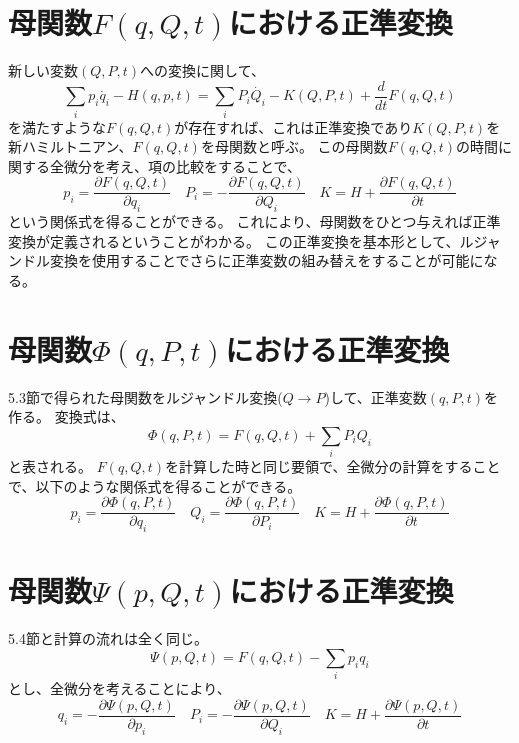 \documentclass[a4paper]{jsreport}
\begin{document}
        \section{母関数$F(q, Q, t)$における正準変換}
            新しい変数$(Q, P, t)$への変換に関して、
            \begin{equation}
                \sum_{i} p_i \dot{q_i} - H(q, p, t) = \sum_{i} P_i \dot{Q_i} - K(Q, P, t) + \frac{d}{dt} F(q, Q, t)
            \end{equation}
            を満たすような$F(q, Q, t)$が存在すれば、これは正準変換であり$K(Q, P, t)$を新ハミルトニアン、$F(q, Q, t)$を母関数と呼ぶ。
            この母関数$F(q, Q, t)$の時間に関する全微分を考え、項の比較をすることで、
            \begin{equation} \label{eq:5a}
                p_i = \frac{\partial F(q, Q, t)}{\partial q_i} \quad P_i = - \frac{\partial F(q, Q, t)}{\partial Q_i} \quad K = H + \frac{\partial F(q, Q, t)}{\partial t}
            \end{equation}
            という関係式を得ることができる。
            これにより、母関数をひとつ与えれば正準変換が定義されるということがわかる。
            この正準変換を基本形として、ルジャンドル変換を使用することでさらに正準変数の組み替えをすることが可能になる。

        \section{母関数$\Phi(q, P, t)$における正準変換}
            5.3節で得られた母関数をルジャンドル変換($Q \to P$)して、正準変数$(q, P, t)$を作る。
            変換式は、
            \begin{equation}
                \Phi(q, P, t) = F(q, Q, t) + \sum_{i} P_i Q_i
            \end{equation}
            と表される。
            $F(q, Q, t)$を計算した時と同じ要領で、全微分の計算をすることで、以下のような関係式を得ることができる。
            \begin{equation} \label{eq:5b}
                p_i = \frac{\partial \Phi(q, P, t)}{\partial q_i} \quad Q_i = \frac{\partial \Phi(q, P, t)}{\partial P_i} \quad K = H + \frac{\partial \Phi(q, P, t)}{\partial t}
            \end{equation}

        \section{母関数$\Psi(p, Q, t)$における正準変換}
            5.4節と計算の流れは全く同じ。
            \begin{equation}
                \Psi(p, Q, t) = F(q, Q, t) - \sum_{i} p_i q_i
            \end{equation}
            とし、全微分を考えることにより、
            \begin{equation} \label{eq:5c}
                q_i = - \frac{\partial \Psi(p, Q, t)}{\partial p_i} \quad P_i = - \frac{\partial \Psi(p, Q, t)}{\partial Q_i} \quad K = H + \frac{\partial \Psi(p, Q, t)}{\partial t}
            \end{equation}
\end{document}
